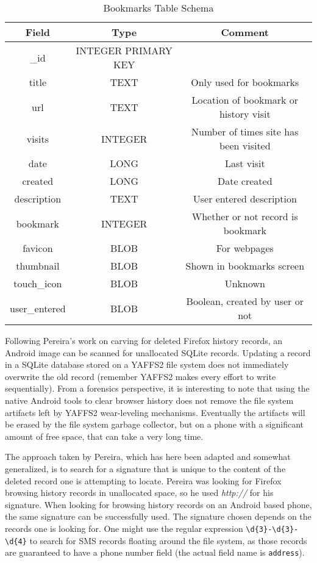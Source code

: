 \begin{table}[htb]
\begin {center}
	\begin{tabular}{| c | c | c |}
	\hline
	Field & Type & Comment \\
	\hline
	\_id & INTEGER PRIMARY KEY & \\
	title & TEXT  &  Only used for bookmarks \\
	url & TEXT  & Location of bookmark or history visit \\
	visits & INTEGER  & Number of times site has been visited \\
	date & LONG  &  Last visit \\
	created & LONG &  Date created \\
	description & TEXT &  User entered description \\
	bookmark & INTEGER & Whether or not record is bookmark \\
	favicon & BLOB &  For webpages \\
	thumbnail & BLOB &  Shown in bookmarks screen \\
	touch\_icon & BLOB &  Unknown \\
	user\_entered & BLOB & Boolean, created by user or not \\
	\hline
	\end{tabular}
\end{center}
	\caption{Bookmarks Table Schema}
	\label{tab:bookmarkschema}
\end{table}

Following Pereira's work on carving for deleted Firefox history records, an Android image can be scanned for unallocated SQLite
records.  Updating a record in a SQLite database stored on a YAFFS2 file system does not immediately overwrite the old record
(remember YAFFS2 makes every effort to write sequentially).  From a forensics perspective, it is interesting to note that using the
native Android tools to clear browser history does not remove the file system artifacts left by YAFFS2 wear-leveling mechanisms.
Eventually the artifacts will be erased by the file system garbage collector, but on a phone with a significant amount of free space,
that can take a very long time.

The approach taken by Pereira, which has here been adapted and somewhat generalized, is to search for a signature that is unique to
the content of the deleted record one is attempting to locate.  Pereira was looking for Firefox browsing history records in
unallocated space, so he used \emph{http://} for his signature.  When looking for browsing history records on an Android based
phone, the same signature can be successfully used.  The signature chosen depends on the records one is looking for.  One might use
the regular expression \verb|\d{3}-\d{3}-\d{4}| to search for SMS records floating around the file system, as those records are guaranteed
to have a phone number field (the actual field name is \texttt{address}). 

